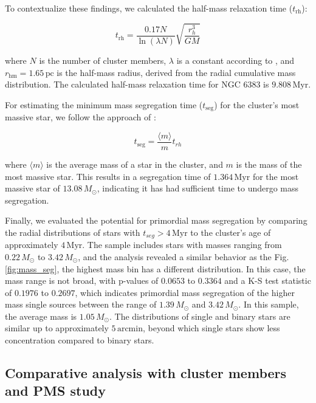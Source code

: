 \documentclass[fleqn,usenatbib,usedcolumn,useAMS]{mnras}
\begin{document}
To contextualize these findings, we calculated the half-mass relaxation time ($t_{\mathrm{rh}}$):

\begin{equation}
	t_{\mathrm{rh}} = \frac{0.17N}{\ln(\lambda N)}\sqrt{\frac{r_h^3}{GM}}
\end{equation}

where $N$ is the number of cluster members, $\lambda$ is a constant according to \citet{1994MNRAS.268..257G}, and $r_\mathrm{hm} = 1.65\,\mathrm{pc}$ is the half-mass radius, derived from the radial cumulative mass distribution. The calculated half-mass relaxation time for NGC 6383 is $9.808\,\mathrm{Myr}$.

For estimating the minimum mass segregation time ($t_{\mathrm{seg}}$) for the cluster's most massive star, we follow the approach of \citet{1969ApJ...158L.139S}:

\begin{equation}
t_{\mathrm{seg}} = \frac{\langle m \rangle}{m}t_{rh}
\end{equation}

where $\langle m \rangle$ is the average mass of a star in the cluster, and $m$ is the mass of the most massive star. This results in a segregation time of $1.364\,\mathrm{Myr}$ for the most massive star of $13.08\,M_\odot$, indicating it has had sufficient time to undergo mass segregation.

Finally, we evaluated the potential for primordial mass segregation by comparing the radial distributions of stars with $t_{seg} > 4\,\mathrm{Myr}$ to the cluster's age of approximately $4\,\mathrm{Myr}$. The sample includes stars with masses ranging from $0.22\,M_\odot$ to $3.42\,M_\odot$, and the analysis revealed a similar behavior as the Fig. \ref{fig:mass_seg}, the highest mass bin has a different distribution. In this case, the mass range is not broad, with p-values of $0.0653$ to $0.3364 $ and a K-S test statistic of $0.1976$ to $0.2697$, which indicates primordial mass segregation of the higher mass single sources between the range of $1.39\,M_\odot$ and $3.42\,M_\odot$. In this sample, the average mass is $1.05\,M_\odot$. The distributions of single and binary stars are similar up to approximately $5\,\mathrm{arcmin}$, beyond which single stars show less concentration compared to binary stars.

\subsection{Comparative analysis with cluster members and PMS study}
\end{document}
